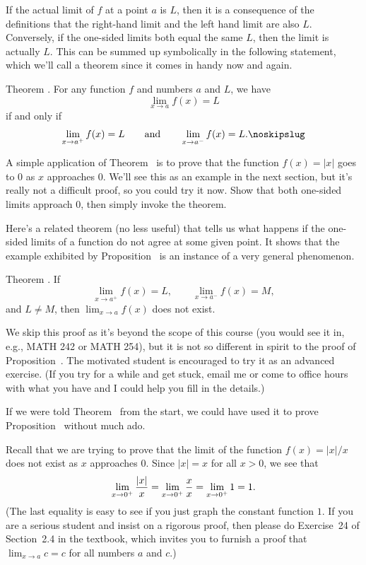 If the actual limit of $f$ at a point $a$ is $L$, then it is a consequence of the definitions that
the right-hand limit and the left hand limit are also $L$. Conversely, if the one-sided limits both equal
the same $L$, then the limit is actually $L$. This can be summed up symbolically in the following statement,
which we'll call a theorem since it comes in handy now and again.

\edef\thmonesidedsame{\the\thmcount}
\proclaim Theorem \advthm. For any function $f$ and numbers $a$ and $L$, we have
$$\lim_{x\to a} f(x) = L$$
if and only if
$$\lim_{x\to a^+} f(x) = L\qquad\hbox{and}\qquad \lim_{x\to a^-} f(x) = L.\noskipslug$$

A simple application of Theorem~{\thmonesidedsame} is to prove that the function $f(x) = |x|$ goes to $0$ as $x$
approaches $0$. We'll see this as an example in the next section, but it's really not a difficult proof,
so you could try it now. Show that both one-sided limits approach $0$, then simply invoke the theorem.

Here's a related theorem (no less useful) that tells us what happens if the one-sided limits
of a function do not agree at some given point. It shows that the example exhibited by Proposition~{\proplimdne}
is an instance of a very general phenomenon.

\edef\thmonesideddiff{\the\thmcount}
\proclaim Theorem \advthm. If
$$\lim_{x\to a^+} f(x) = L,\qquad \lim_{x\to a^-} f(x) = M,$$
and $L\ne M$, then $\lim_{x\to a} f(x)$ does not exist.

\proof We skip this proof as it's beyond the scope of this course (you would see it in, e.g., {\mc MATH} 242
or {\mc MATH} 254), but it is not so different in spirit
to the proof of Proposition~{\proplimdne}. The motivated student is encouraged to try it as an
advanced exercise. (If you try for a while and get stuck, email me or come to office hours with what
you have and I could help you fill in the details.)\slug

If we were told Theorem~{\thmonesideddiff} from the start, we could have used it to prove
Proposition~{\proplimdne} without much ado.

\medskip\noindent{\it Proof of Proposition~{\proplimdne} using Theorem~{\thmonesideddiff}.}\enspace
Recall that we are trying to prove that the limit of the function $f(x) = |x|/x$ does not exist
as $x$ approaches $0$.
Since $|x|  = x$ for all $x>0$, we see that
$$\lim_{x\to 0^+} {|x|\over x} = \lim_{x\to 0^+} {x\over x} = \lim_{x\to 0^+} 1 = 1.$$
(The last equality is easy to see if you just graph the constant function $1$. If you are a serious
student and insist on a rigorous proof, then please do Exercise~24 of Section~2.4 in the textbook,
which invites you to furnish
a proof that $\lim_{x\to a} c = c$ for all numbers $a$ and $c$.)

